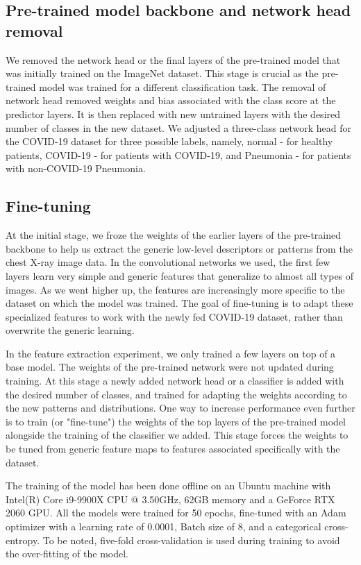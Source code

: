  \subsection{Pre-trained model backbone and network head removal}

We removed the network head or the final layers of the pre-trained model that was initially trained on the ImageNet dataset. This stage is crucial as the pre-trained model was trained for a different classification task. The removal of network head removed weights and bias associated with the class score at the predictor layers.
It is then replaced with new untrained layers with the desired number of classes in the new dataset. We adjusted a three-class network head for the COVID-19 dataset for three possible labels, namely, normal - for healthy patients, COVID-19 - for patients with COVID-19, and Pneumonia - for patients with non-COVID-19 Pneumonia. 
 

 \subsection{Fine-tuning}
 At the initial stage, we froze the weights of the earlier layers of the pre-trained backbone to help us extract the generic low-level descriptors or patterns from the chest X-ray image data. In the convolutional networks we used, the first few layers learn very simple and generic features that generalize to almost all types of images. As we went higher up, the features are increasingly more specific to the dataset on which the model was trained. The goal of fine-tuning is to adapt these specialized features to work with the newly fed COVID-19 dataset, rather than overwrite the generic learning.
 
 In the feature extraction experiment, we only trained a few layers on top of a base model. The weights of the pre-trained network were not updated during training.
At this stage a newly added network head or a classifier is added with the desired number of classes, and trained for adapting the weights according to the new patterns and distributions. One way to increase performance even further is to train (or "fine-tune") the weights of the top layers of the pre-trained model alongside the training of the classifier we added. This stage forces the weights to be tuned from generic feature maps to features associated specifically with the dataset.
 
 The training of the model has been done offline on an Ubuntu machine with Intel(R) Core i9-9900X CPU @ 3.50GHz, 62GB memory and a GeForce RTX 2060 GPU. All the models were trained  for 50 epochs, fine-tuned with an Adam optimizer with a learning rate of 0.0001, Batch size of 8,  and a categorical cross-entropy. To be noted, five-fold cross-validation is used during training to avoid the over-fitting of the model. 


